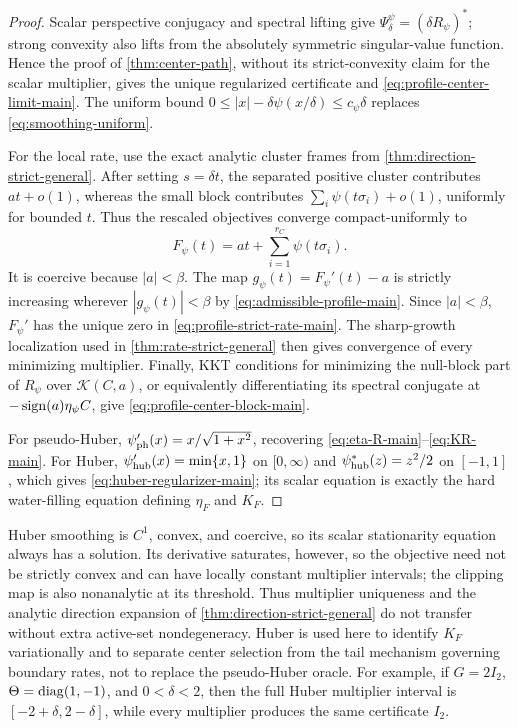 \begin{proof}
Scalar perspective conjugacy and spectral lifting give
\(\Psi_\delta^\psi=(\delta R_\psi)^*\); strong convexity also lifts from
the absolutely symmetric singular-value function.  Hence the proof of
\cref{thm:center-path}, without its strict-convexity claim for the scalar
multiplier, gives the unique regularized certificate and
\eqref{eq:profile-center-limit-main}.  The uniform bound
\(0\le |x|-\delta\psi(x/\delta)\le c_\psi\delta\) replaces
\eqref{eq:smoothing-uniform}.

For the local rate, use the exact analytic cluster frames from
\cref{thm:direction-strict-general}.  After setting
\(s=\delta t\), the separated positive cluster contributes \(at+o(1)\),
whereas the small block contributes
\(\sum_i\psi(t\sigma_i)+o(1)\), uniformly for bounded \(t\).  Thus the
rescaled objectives converge compact-uniformly to
\[
 F_\psi(t)=at+\sum_{i=1}^{r_C}\psi(t\sigma_i).
\]
It is coercive because \(|a|<\beta\).  The map
\(g_\psi(t)=F_\psi'(t)-a\) is strictly increasing wherever
\(|g_\psi(t)|<\beta\) by \eqref{eq:admissible-profile-main}.  Since
\(|a|<\beta\), \(F_\psi'\) has the unique zero in
\eqref{eq:profile-strict-rate-main}.  The sharp-growth localization used in
\cref{thm:rate-strict-general} then gives convergence of every minimizing
multiplier.  Finally, KKT conditions for minimizing the null-block part of
\(R_\psi\) over \(\mathcal K(C,a)\), or equivalently differentiating its
spectral conjugate at \(-\operatorname{sign}(a)\eta_\psi C\), give
\eqref{eq:profile-center-block-main}.

For pseudo-Huber, \(\psi'_{\rm ph}(x)=x/\sqrt{1+x^2}\), recovering
\eqref{eq:eta-R-main}--\eqref{eq:KR-main}.  For Huber,
\(\psi'_{\rm hub}(x)=\min\{x,1\}\) on \([0,\infty)\) and
\(\psi_{\rm hub}^*(z)=z^2/2\) on \([-1,1]\), which gives
\eqref{eq:huber-regularizer-main}; its scalar equation is exactly the hard
water-filling equation defining \(\eta_F\) and \(K_F\).
\end{proof}

\begin{remark}
\label{rem:huber-caveat-main}
Huber smoothing is \(C^1\), convex, and coercive, so its scalar stationarity
equation always has a solution.  Its derivative saturates, however, so the
objective need not be strictly convex and can have locally constant
multiplier intervals; the clipping map is also nonanalytic at its threshold.
Thus multiplier uniqueness and the analytic direction expansion of
\cref{thm:direction-strict-general} do not transfer without extra active-set
nondegeneracy.  Huber is used here to identify \(K_F\) variationally and to
separate center selection from the tail mechanism governing boundary rates,
not to replace the pseudo-Huber oracle.
For example, if \(G=2I_2\), \(\Theta=\operatorname{diag}(1,-1)\), and \(0<\delta<2\),
then the full Huber multiplier interval is
\([-2+\delta,2-\delta]\), while every multiplier produces the same
certificate \(I_2\).
\end{remark}

